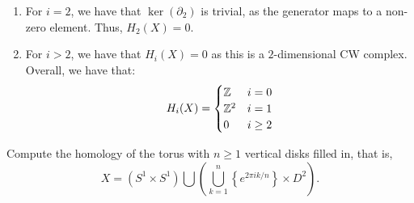 \documentclass[12pt]{article}
\begin{document}
\begin{solution}
\begin{enumerate}
        \item For $i = 2$, we have that $\ker(\partial_2)$ is trivial, as the generator maps to a non-zero element. Thus, $H_2(X) = 0$.
        \item For $i > 2$, we have that $H_i(X) = 0$ as this is a $2$-dimensional CW complex.
        Overall, we have that:
        \[ H_i(X) = \begin{cases} 
            \mathbb Z & i = 0 \\
            \mathbb Z^2 & i = 1 \\
            0 & i \geq 2
            \end{cases}\]
        \end{enumerate} 
\end{solution}

\newpage

\begin{problem}{2}
    Compute the homology of the torus with $n \geq 1$ vertical disks filled in, that is, 
\[ X = (S^1 \times S^1) \bigcup \left( \bigcup_{k=1}^{n} \left\{ e^{2 \pi i k/n}\right\}  \times D^2 \right). \]
\end{problem}
\end{document}
